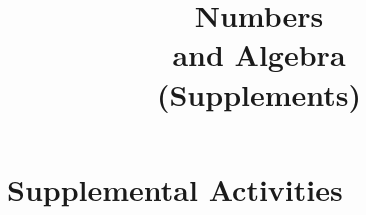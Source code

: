 \documentclass[justified,openany,nofonts]{tufte-book}
\title{Numbers \\ and Algebra \\ (Supplements)}
\author{\teachingnotes}
\renewcommand{\theenumi}{$(\mathrm{\arabic{enumi}})$}
\renewcommand{\labelenumi}{\theenumi}
\begin{document}
\def\document#1{} %
\def\clarification#1{}  %

\maketitle

%

\setcounter{tocdepth}{1}
\tableofcontents

\setcounter{secnumdepth}{2} %


%

\appendix

\renewcommand{\theenumi}{$(\mathrm{\alph{enumi}})$}
\renewcommand{\labelenumi}{\theenumi}
\chapter{Supplemental Activities}





\setcounter{section}{19}


%


\setcounter{section}{49}










\end{document}
